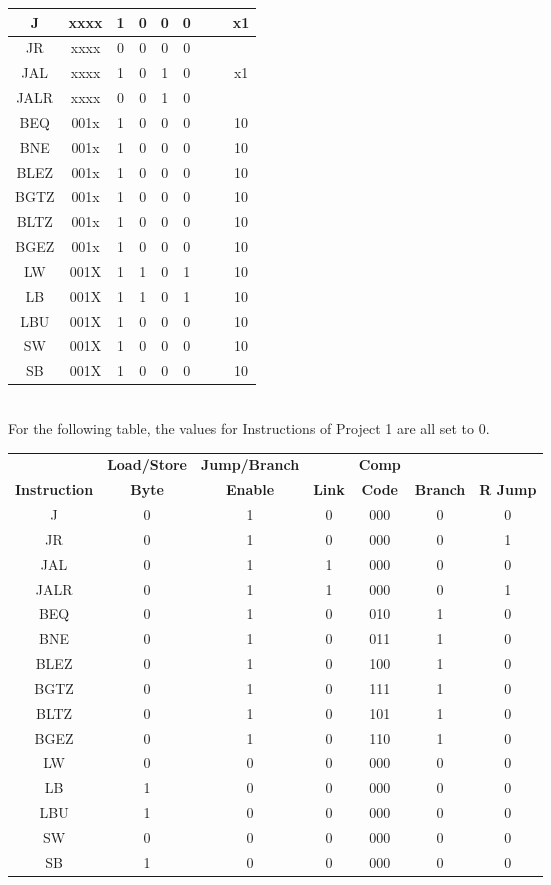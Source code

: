 \documentclass{article}
\begin{document}
\begin{center}
\begin{tabular}{|c|c|c|c|c|c|c|c|c|}
J & xxxx & 1 & 0 & 0 & 0 &&&x1 \\ \hline
JR & xxxx & 0 & 0 & 0 & 0 &&& \\ \hline
JAL & xxxx & 1 & 0 & 1 & 0 &&&x1 \\ \hline
JALR & xxxx & 0 & 0 & 1 & 0 &&& \\ \hline
BEQ & 001x & 1 & 0 & 0 & 0 &&&10 \\ \hline
BNE & 001x & 1 & 0 & 0 & 0 &&&10 \\ \hline
BLEZ& 001x & 1 & 0 & 0 & 0 &&&10 \\ \hline
BGTZ& 001x & 1 & 0 & 0 & 0 &&&10 \\ \hline
BLTZ& 001x & 1 & 0 & 0 & 0 &&&10 \\ \hline
BGEZ& 001x & 1 & 0 & 0 & 0 &&&10 \\ \hline
LW & 001X & 1 & 1 & 0 & 1 &&& 10 \\ \hline
LB & 001X & 1 & 1 & 0 & 1 &&& 10 \\ \hline
LBU & 001X & 1 & 0 & 0 & 0 &&& 10 \\ \hline
SW & 001X & 1 & 0 & 0 & 0 &&& 10 \\ \hline
SB & 001X & 1 & 0 & 0 & 0 &&& 10 \\ \hline
\end{tabular} \vspace{2mm}\\
For the following table, the values for Instructions of Project 1 are all set to 0.
\begin{tabular}{|c|c|c|c|c|c|c|} \hline
& \textbf{Load/Store} & \textbf{Jump/Branch} && \textbf{Comp} & & \\ 
\textbf{Instruction} & \textbf{Byte} & \textbf{Enable} & \textbf{Link} & \textbf{Code} & \textbf{Branch} & \textbf{R Jump} \\ \hline
J &0& 1 & 0 & 000 & 0 & 0 \\ \hline
JR &0& 1 & 0 & 000 & 0 & 1 \\ \hline
JAL &0& 1 & 1 & 000 & 0 & 0 \\ \hline
JALR &0& 1 & 1 & 000 & 0 & 1 \\ \hline
BEQ &0& 1 & 0 & 010 & 1 & 0 \\ \hline
BNE &0& 1 & 0 & 011 & 1 & 0 \\ \hline
BLEZ &0& 1 & 0 & 100 & 1 & 0 \\ \hline
BGTZ &0& 1 & 0 & 111 & 1 & 0 \\ \hline
BLTZ &0& 1 & 0 & 101 & 1 & 0 \\ \hline
BGEZ &0& 1 & 0 & 110 & 1 & 0 \\ \hline
LW & 0 & 0 & 0  &000& 0&0 \\ \hline
LB & 1 & 0 & 0  &000& 0&0 \\ \hline
LBU & 1 & 0 & 0  &000& 0&0 \\ \hline
SW & 0 & 0 & 0  &000& 0&0 \\ \hline
SB & 1 & 0 & 0 &000& 0&0 \\ \hline
\end{tabular}
\end{center}
\end{document}
